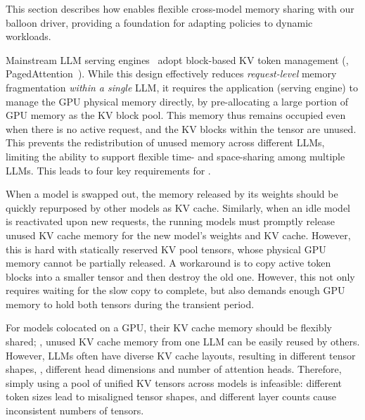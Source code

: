 \label{sec:sys}

This section describes how \tool enables flexible cross-model memory sharing with our balloon driver, providing a foundation for adapting policies to dynamic workloads.

\label{sec:flex-mem}

Mainstream LLM serving engines~\cite{sglang@arxiv23,kwon2023efficient} adopt block-based KV token management (\eg, PagedAttention~\cite{kwon2023efficient}). 
While this design effectively reduces \emph{request-level} memory fragmentation \emph{within a single} LLM, it requires the application (serving engine) to manage the GPU physical memory directly, by pre-allocating a large portion of GPU memory as the KV block pool.
This memory thus remains occupied even when there is no active request, and the KV blocks within the tensor are unused.
This prevents the redistribution of unused memory across different LLMs, limiting the ability to support flexible time- and space-sharing among multiple LLMs. 
This leads to four key requirements for \tool.

When a model is swapped out, the memory released by its weights should be quickly repurposed by other models as KV cache. Similarly, when an idle model is reactivated upon new requests, the running models must promptly release unused KV cache memory for the new model's weights and KV cache.
However, this is hard with statically reserved KV pool tensors, whose physical GPU memory cannot be partially released.
A workaround is to copy active token blocks into a smaller tensor and then destroy the old one. 
However, this not only requires waiting for the slow copy to complete, but also demands enough GPU memory to hold both tensors during the transient period.

For models colocated on a GPU, their KV cache memory should be flexibly shared; \eg, unused KV cache memory from one LLM can be easily reused by others.
However, LLMs often have diverse KV cache layouts, resulting in different tensor shapes, \eg, different head dimensions and number of attention heads. 
Therefore, simply using a pool of unified KV tensors across models is infeasible: different token sizes lead to misaligned tensor shapes, and different layer counts cause inconsistent numbers of tensors.


